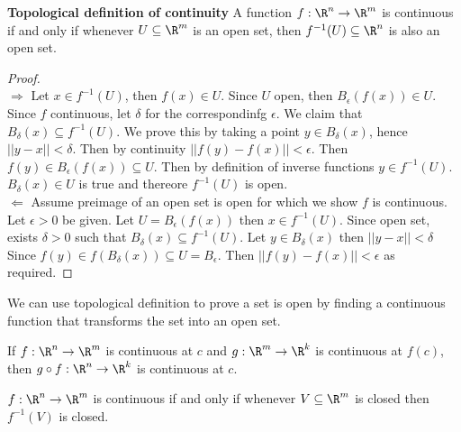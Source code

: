\documentclass[11pt]{article}
\begin{document}
\begin{theorem*}
  \label{Topological definition of continuity}
  \textbf{Topological definition of continuity} A function $f:\R^n \to \R^m$ is continuous if and only if whenever $U\subseteq \R^m$ is an open set, then $f^{-1}(U) \subseteq \R^n$ is also an open set.
  \begin{proof}
    $ $\\
    $\Rightarrow$ Let $x\in f^{-1}(U)$, then $f(x)\in U$. Since $U$ open, then $B_{\epsilon}(f(x))\in U$. Since $f$ continuous, let $\delta$ for the correspondinfg $\epsilon$. We claim that $B_{\delta}(x)\subseteq f^{-1}(U)$. We prove this by taking a point $y\in B_{\delta}(x)$, hence $||y-x|| < \delta$. Then by continuity $||f(y)-f(x)|| < \epsilon$. Then $f(y)\in B_{\epsilon}(f(x))\subseteq U$. Then by definition of inverse functions $y\in f^{-1}(U)$. $B_{\delta}(x)\in U$ is true and thereore $f^{-1}(U)$ is open.\\
    $\Leftarrow$ Assume preimage of an open set is open for which we show $f$ is continuous. Let $\epsilon > 0$ be given. Let $U = B_{\epsilon}(f(x))$ then $x\in f^{-1}(U)$. Since open set, exists $\delta > 0$ such that $B_{\delta}(x) \subseteq f^{-1}(U)$. Let $y\in B_{\delta}(x)$ then $|| y - x|| < \delta$ Since $f(y) \in f(B_{\delta}(x)) \subseteq U = B_{\epsilon}$. Then $||f(y)-f(x)|| < \epsilon$ as required.
  \end{proof}
  \begin{rem}
    We can use topological definition to prove a set is open by finding a continuous function that transforms the set into an open set.
  \end{rem}
\end{theorem*}

\begin{theorem*}
  If $f:\R^n \to \R^m$ is continuous at $c$ and $g:\R^m \to \R^k$ is continuous at $f(c)$, then $g\circ f: \R^n \to \R^k$ is continuous at $c$.
\end{theorem*}

\begin{proposition*}
  $f:\R^n \to \R^m$ is continuous if and only if whenever $V\subseteq \R^m$ is closed then $f^{-1}(V)$ is closed.
\end{proposition*}
\end{document}
